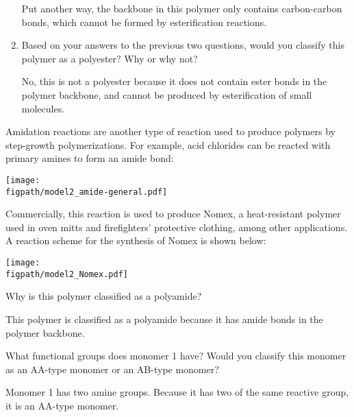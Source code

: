 \begin{activity}
\begin{ctqs}
\begin{enumerate}
\begin{solution}[2in]
					Put another way, the backbone in this polymer only contains carbon-carbon bonds, which cannot be formed by esterification reactions.
				\end{solution}
			
			\item Based on your answers to the previous two questions, would you classify this polymer as a polyester?  Why or why not?
			
				\begin{solution}[2in]
					No, this is not a polyester because it does not contain ester bonds in the polymer backbone, and cannot be produced by esterification of small molecules.
				\end{solution}
			
		\end{enumerate}
		
\end{ctqs}
	

\clearpage
\begin{model}

Amidation reactions are another type of reaction used to produce polymers by step-growth polymerizations.
For example, acid chlorides can be reacted with primary amines to form an amide bond:
	
	\centerline{\texttt{[image: \\figpath/model2\_amide-general.pdf]}}

Commercially, this reaction is used to produce Nomex, a heat-resistant polymer used in oven mitts and firefighters' protective clothing, among other applications.
A reaction scheme for the synthesis of Nomex is shown below:
	
	\centerline{\texttt{[image: \\figpath/model2\_Nomex.pdf]}}

\end{model}

\begin{ctqs}
		\question Why is this polymer classified as a polyamide?
			
				\begin{solution}[1.5in]
					This polymer is classified as a polyamide because it has amide bonds in the polymer backbone.
				\end{solution}
		
		\question What functional groups does monomer 1 have?   Would you classify this monomer as an AA-type monomer or an AB-type monomer?
			
				\begin{solution}[0.75in]
					Monomer 1 has two amine groups.  Because it has two of the same reactive group, it is an AA-type monomer.
				\end{solution}
		

\end{ctqs}
\end{activity}
